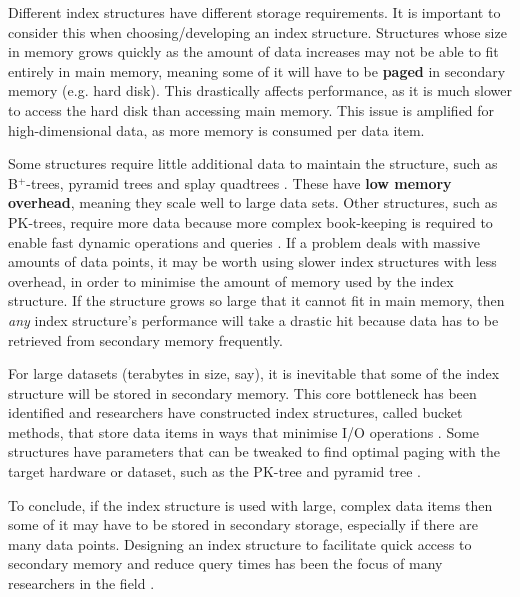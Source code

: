Different index structures have different storage requirements. It is important to consider this when choosing/developing an index structure. Structures whose size in memory grows quickly as the amount of data increases may not be able to fit entirely in main memory, meaning some of it will have to be \textbf{paged} in secondary memory (e.g. hard disk). This drastically affects performance, as it is much slower to access the hard disk than accessing main memory. This issue is amplified for high-dimensional data, as more memory is consumed per data item.

Some structures require little additional data to maintain the structure, such as B${}^{+}$-trees, pyramid trees and splay quadtrees \cite{ubiquitous-btree, pyramid-tree, splay-quadtree}. These have \textbf{low memory overhead}, meaning they scale well to large data sets. Other structures, such as PK-trees, require more data because more complex book-keeping is required to enable fast dynamic operations and queries \cite{pk-tree}. If a problem deals with massive amounts of data points, it may be worth using slower index structures with less overhead, in order to minimise the amount of memory used by the index structure. If the structure grows so large that it cannot fit in main memory, then \textit{any} index structure's performance will take a drastic hit because data has to be retrieved from secondary memory frequently.

For large datasets (terabytes in size, say), it is inevitable that some of the index structure will be stored in secondary memory. This core bottleneck has been identified and researchers have constructed index structures, called bucket methods, that store data items in ways that minimise I/O operations \cite{md-structures-samet}. Some structures have parameters that can be tweaked to find optimal paging with the target hardware or dataset, such as the PK-tree and pyramid tree \cite{pyramid-tree, pk-tree}.

To conclude, if the index structure is used with large, complex data items then some of it may have to be stored in secondary storage, especially if there are many data points. Designing an index structure to facilitate quick access to secondary memory and reduce query times has been the focus of many researchers in the field  \cite{rsr-tree, rs-tree}.
